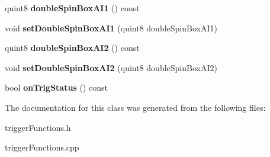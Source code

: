 \begin{DoxyCompactItemize}
quint8 {\bfseries double\+Spin\+Box\+A\+I1} () const
\item 
\mbox{\label{class_trigger_functions_a98dccf3ffc04858a2592041f2416e565}} 
void {\bfseries set\+Double\+Spin\+Box\+A\+I1} (quint8 double\+Spin\+Box\+A\+I1)
\item 
\mbox{\label{class_trigger_functions_a4a9ba2fd7c24f1492364f33e757fcb64}} 
quint8 {\bfseries double\+Spin\+Box\+A\+I2} () const
\item 
\mbox{\label{class_trigger_functions_a4ece884b0bf22119377d2f70bbfa54bb}} 
void {\bfseries set\+Double\+Spin\+Box\+A\+I2} (quint8 double\+Spin\+Box\+A\+I2)
\item 
\mbox{\label{class_trigger_functions_a9ea48e292e85152099879ae11bbe93f6}} 
bool {\bfseries on\+Trig\+Status} () const
\end{DoxyCompactItemize}


The documentation for this class was generated from the following files\+:\begin{DoxyCompactItemize}
\item 
trigger\+Functions.\+h\item 
trigger\+Functions.\+cpp\end{DoxyCompactItemize}
